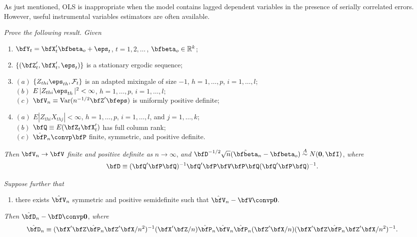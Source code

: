As just mentioned, OLS is inappropriate when the model contains lagged dependent variables in the presence of serially correlated errors. However, useful instrumental variables estimators are often available.

\begin{exercises}

\item\label{ex:iv-did-clt} \textit{Prove the following result. Given}
\begin{enumerate}
\item[$(i)$] $\bfY_t = \bfX_t'\bfbeta_o + \eps_t$, \quad $t = 1, 2, \ldots$\,, $\bfbeta_o \in \mathbb{R}^k$;
\item[$(ii)$] $\{(\bfZ_t', \bfX_t', \eps_t)\}$ is a stationary ergodic sequence;
\item[$(iii)$] $(a)$ $\{Z_{thi}\eps_{th}, \mathcal{F}_t\}$ is an adapted mixingale of size $-1$, $h = 1, \ldots, p$, $i = 1, \ldots, l$;\\
$(b)$ $E\,|Z_{thi}\eps_{th}\,|^2 < \infty$, $h = 1, \ldots, p$, $i = 1, \ldots, l$;\\
$(c)$ $\bfV_n \equiv \Var(n^{-1/2}\bfZ'\bfeps)$ is uniformly positive definite;
\item[$(iv)$] $(a)$ $E|Z_{thi}X_{thj}| < \infty$, $h = 1, \ldots, p$, $i = 1, \ldots, l$, and $j = 1, \ldots, k$;\\
$(b)$ $\bfQ \equiv E(\bfZ_t\bfX_t')$ has full column rank;\\
$(c)$ $\hat{\bfP}_n \convp \bfP$ finite, symmetric, and positive definite.
\end{enumerate}

\textit{Then} $\bfV_n \to \bfV$ \textit{finite and positive definite as} $n \to \infty$, \textit{and} $\bfD^{-1/2}\sqrt{n}(\tilde{\bfbeta}_n - \bfbeta_o) \overset{A}{\sim} N(\mathbf{0}, \bfI)$, \textit{where}
\[
\bfD \equiv (\bfQ'\bfP\bfQ)^{-1}\bfQ'\bfP\bfV\bfP\bfQ(\bfQ'\bfP\bfQ)^{-1}.
\]

\textit{Suppose further that}

\begin{enumerate}
\item[$(v)$] there exists $\hat{\bfV}_n$ symmetric and positive semidefinite such that $\hat{\bfV}_n - \bfV \convp \mathbf{0}$.
\end{enumerate}

\textit{Then} $\hat{\bfD}_n - \bfD \convp \mathbf{0}$, \textit{where}
\[
\hat{\bfD}_n \equiv (\bfX'\bfZ\hat{\bfP}_n\bfZ'\bfX/n^2)^{-1}(\bfX'\bfZ/n)\hat{\bfP}_n\hat{\bfV}_n\hat{\bfP}_n(\bfZ'\bfX/n)(\bfX'\bfZ\hat{\bfP}_n\bfZ'\bfX/n^2)^{-1}.
\]
\end{exercises}

